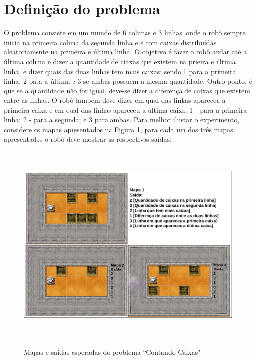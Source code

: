 \section{Definição do problema}
\label{sec:defprob}
O problema consiste em um mundo de 6 colunas e 3 linhas, onde o robô sempre inicia na primeira coluna da segunda linha e e com caixas distribuídas aleatoriamente na primeira e última linha. O objetivo é fazer o robô andar até a última coluna e dizer a quantidade de ciaxas que existem na prieira e última linha, e dizer quais das duas linhas tem mais caixas: sendo 1 para a primeira linha, 2 para a última e 3 se ambas possuem a mesma quantidade. Outro ponto, é que se a quantidade não for igual, deve-se dizer a diferença de caixas que existem entre as linhas. O robô também deve dizer em qual das linhas apareceu a primeira caixa e em qual das linhas apareceu a última caixa: 1 - para a primeira linha; 2 - para a segunda; e 3 para ambas. Para melhor ilustar o experimento, considere os mapas apresentados na Figura \ref{fig:problem}, para cada um dos três mapas apresentados o robô deve mostrar as respectivas saídas.

\begin{figure}[h]
\centering
\caption{Mapas e saídas esperadas do problema ``Contando Caixas"}
\includegraphics[height=10cm]{figuras/problema.png}
\label{fig:problem}
\end{figure}

